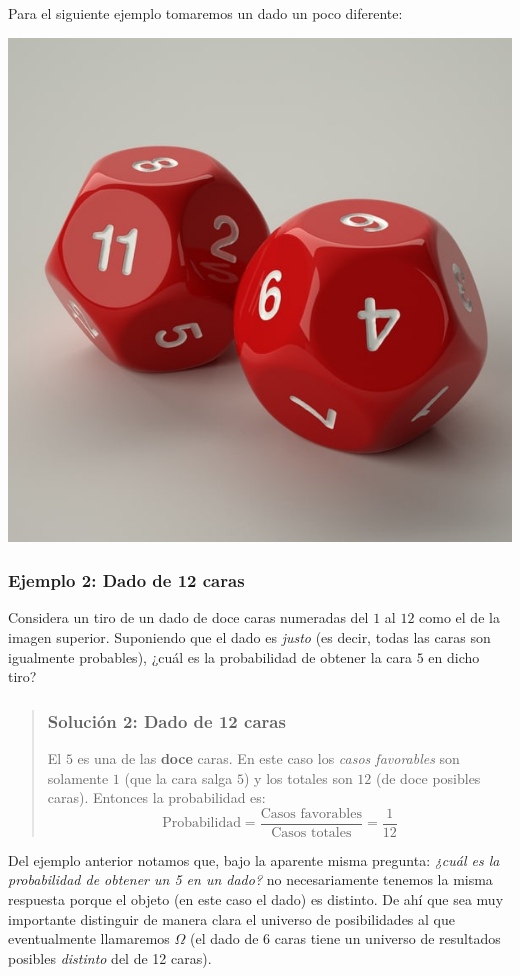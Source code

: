 \documentclass[
]{book}
\newenvironment{Ejemplo}
{\begin{mdframed}[
  linecolor=ejemplocolor,
  skipabove=12pt,
  skipbelow=12pt,
  roundcorner=20pt,
  splittopskip=2\topsep]}
{\end{mdframed}}
\begin{document}
Para el siguiente ejemplo tomaremos un dado un poco diferente:

\begin{center}\includegraphics[width=0.2\linewidth]{images/dado_12_caras} \end{center}

\begin{Ejemplo}
\hypertarget{ejemplo-2-dado-de-12-caras}{%
\subsubsection{Ejemplo 2: Dado de 12
caras}\label{ejemplo-2-dado-de-12-caras}}

Considera un tiro de un dado de doce caras numeradas del \(1\) al \(12\)
como el de la imagen superior. Suponiendo que el dado es \emph{justo}
(es decir, todas las caras son igualmente probables), ¿cuál es la
probabilidad de obtener la cara \(5\) en dicho tiro?

\begin{quote}
\hypertarget{soluciuxf3n-2-dado-de-12-caras}{%
\subsubsection{Solución 2: Dado de 12
caras}\label{soluciuxf3n-2-dado-de-12-caras}}

El \(5\) es una de las \textbf{doce} caras. En este caso los \emph{casos
favorables} son solamente \(1\) (que la cara salga \(5\)) y los totales
son \(12\) (de doce posibles caras). Entonces la probabilidad es: \[
\textrm{Probabilidad} = \dfrac{\text{Casos favorables}}{\text{Casos totales}} = \dfrac{1}{12}
\]
\end{quote}
\end{Ejemplo}

Del ejemplo anterior notamos que, bajo la aparente misma pregunta: \emph{¿cuál es la probabilidad de obtener un 5 en un dado?} no necesariamente tenemos la misma respuesta porque el objeto (en este caso el dado) es distinto. De ahí que sea muy importante distinguir de manera clara el universo de posibilidades al que eventualmente llamaremos \(\Omega\) (el dado de 6 caras tiene un universo de resultados posibles \emph{distinto} del de 12 caras).
\end{document}
